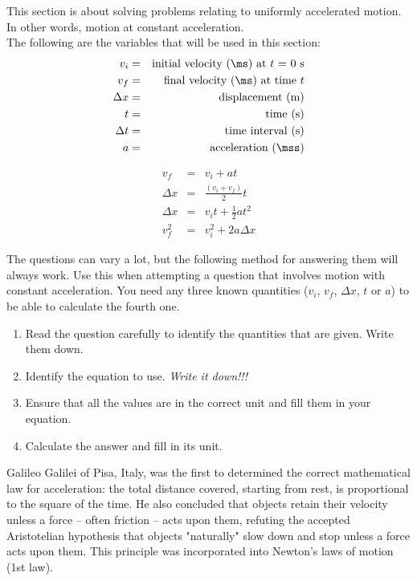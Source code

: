 This section is about solving problems relating to uniformly accelerated motion. In other words, motion at constant acceleration.\\
The following are the variables that will be used in this section:\\
\begin{eqnarray*}
v_i &=& \mbox{initial velocity (\ms) at $t$ = 0 s} \\
v_f &=& \mbox{final velocity (\ms) at time $t$}\\
\Delta x &=& \mbox{displacement (m)} \\
t &=& \mbox{time (s)} \\
\Delta t &=& \mbox{time interval (s)} \\
a &=& \mbox{acceleration (\mss)}
\end{eqnarray*}

\begin{eqnarray}
v_f &=& v_i + at \label{eq:eq1}\\
\Delta x &=& \frac{(v_i + v_f)}{2} t\label{eq:eq2}\\
\Delta x &=& v_it + \frac{1}{2}at^2 \label{eq:eq3}\\
v_f^2 &=& v_i^2 + 2a \Delta x \label{eq:eq4}
\end{eqnarray}

The questions can vary a lot, but the following method for answering them will always work. Use this when attempting a question that involves motion with constant acceleration. You need any three known quantities ($v_i$, $v_f$, $\Delta x$, $t$ or $a$) to be able to calculate the fourth one.

\begin{enumerate}
\item Read the question carefully to identify the quantities that are given. Write them down.
\item Identify the equation to use. \emph{Write it down!!!}
\item Ensure that all the values are in the correct unit and fill them in your equation.
\item Calculate the answer and fill in its unit.
\end{enumerate}

\begin{IFact}{Galileo Galilei of Pisa, Italy,
was the first to determined the correct mathematical law for
acceleration: the total distance covered, starting from rest, is
proportional to the square of the time. He also concluded that
objects retain their velocity unless a force -- often friction --
acts upon them, refuting the accepted Aristotelian hypothesis that
objects "naturally" slow down and stop unless a force acts upon
them. This principle was incorporated into Newton's laws of motion
(1st law).}
\end{IFact}

